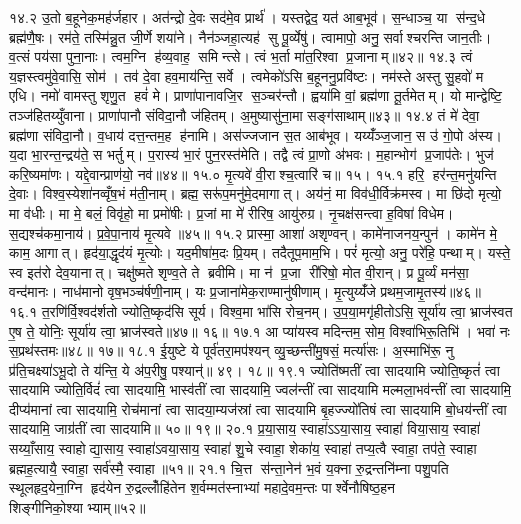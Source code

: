 १४.२
उ॒तो ब॒हूनेक॒मह॑र्जहार। अत॑न्द्रो दे॒वः सद॑मे॒व प्रार्थ॑। यस्तद्वेद॒ यत॑ आब॒भूव॑। स॒न्धाञ्च॒ या स॑न्द॒धे ब्रह्म॑णै॒षः। रम॑ते॒ तस्मि॑न्नु॒त जी॒र्णे शया॑ने। नैन॑ञ्जहा॒त्यह॑ सु पू॒र्व्येषु॑। त्वामापो॒ अनु॒ सर्वाश्चरन्ति जान॒तीः। व॒त्सं पय॑सा पुना॒नाः। त्वम॒ग्नि ह॑व्य॒वाह॒ समिन्त्से। त्वं भ॒र्ता मा॑त॒रिश्वा प्र॒जानाम्॥४२॥
१४.३
त्वं य॒ज्ञस्त्वमु॑वे॒वासि॒ सोम॑। तव॑ दे॒वा हव॒माय॑न्ति॒ सर्वे। त्वमेको॑ऽसि ब॒हूननु॒प्रवि॑ष्टः। नम॑स्ते अस्तु सु॒हवो॑ म एधि। नमो॑ वामस्तु शृणु॒त हवं॑ मे। प्राणा॑पानावजि॒र स॒ञ्चर॑न्तौ। ह्वया॑मि वां॒ ब्रह्म॑णा तू॒र्तमेतम्। यो मान्द्वेष्टि॒ तञ्ज॑हितय्युँवाना। प्राणा॑पानौ संविदा॒नौ ज॑हितम्। अ॒मुष्यासु॑ना॒मा सङ्ग॑साथाम्॥४३॥
१४.४
तं मे॑ देवा॒ ब्रह्म॑णा संविदा॒नौ। व॒धाय॑ दत्त॒न्तम॒ह ह॑नामि। अस॑ज्जजान स॒त आब॑भूव। यय्यँ॑ञ्ज॒जान॒ स उ॑ गो॒पो अ॑स्य। य॒दा भा॒रन्त॒न्द्रय॑ते॒ स भर्तुम्। प॒रास्य॑ भा॒रं पुन॒रस्त॑मेति। तद्वै त्वं प्रा॒णो अ॑भवः। म॒हान्भोग॑ प्र॒जाप॑तेः। भुज॑ करि॒ष्यमा॑णः। यद्दे॒वान्प्राण॑यो॒ नव॑॥४४॥
१५.०
मृ॒त्यवे॑ वी॒राश्च॒त्वारि॑ च॥ १५।
\anuvakamend
१५.१
हरि॒ हर॑न्त॒मनु॑यन्ति दे॒वाः। विश्व॒स्येशा॑नव्वृँष॒भं म॑ती॒नाम्। ब्रह्म॒ सरू॑प॒मनु॑मे॒दमागात्। अय॑नं॒ मा विव॑धी॒र्विक्र॑मस्व। मा छि॑दो मृत्यो॒ मा व॑धीः। मा मे॒ बलं॒  विवृ॑हो॒ मा प्रमो॑षीः। प्र॒जां मा मे॑ रीरिष॒ आयु॑रुग्र। नृ॒चक्ष॑सन्त्वा ह॒विषा॑ विधेम। स॒द्यश्च॑कमा॒नाय॑। प्र॒वे॒पा॒नाय॑ मृ॒त्यवे॥४५॥
१५.२
प्रास्मा॒ आशा॑ अशृण्वन्। कामे॑नाजनय॒न्पुन॑। कामे॑न मे॒ काम॒ आगात्। हृद॑या॒द्धृद॑यं मृ॒त्योः। यद॒मीषा॑म॒दः प्रि॒यम्। तदैतूप॒माम॒भि। परं॑ मृत्यो॒ अनु॒ परे॑हि॒ पन्थाम्। यस्ते॒ स्व इत॑रो देव॒यानात्। चक्षु॑ष्मते शृण्व॒ते ते ब्रवीमि। मा न॑ प्र॒जा री॑रिषो॒ मोत वी॒रान्। प्र पू॒र्व्यं मन॑सा॒ वन्द॑मानः। नाध॑मानो वृष॒भञ्च॑र्\mbox{}षणी॒नाम्। यः प्र॒जाना॑मेक॒राण्मानु॑षीणाम्। मृ॒त्युय्यँ॑जे प्रथम॒जामृ॒तस्य॑॥४६॥
\anuvakamend
१६.१
त॒रणि॑र्वि॒श्वद॑र्\mbox{}शतो ज्योति॒ष्कृद॑सि सूर्य। विश्व॒मा भा॑सि रोच॒नम्। उ॒प॒या॒मगृ॑हीतोऽसि॒ सूर्या॑य त्वा॒ भ्राज॑स्वत ए॒ष ते॒ योनिः॒ सूर्या॑य त्वा॒ भ्राज॑स्वते॥४७॥ १६॥
\anuvakamend
१७.१
आ प्या॑यस्व मदिन्तम॒ सोम॒ विश्वा॑भिरू॒तिभि॑। भवा॑ नः स॒प्रथ॑स्तमः॥४८॥ १७॥
\anuvakamend
१८.१
ई॒युष्टे ये पूर्व॑तरा॒मप॑श्यन् व्यु॒च्छन्ती॑मु॒षसं॒ मर्त्या॑सः। अ॒स्माभि॑रू॒ नु प्र॑ति॒चक्ष्या॑ऽभू॒दो ते य॑न्ति॒ ये अ॑प॒रीषु॒ पश्यान्॑॥ ४९। १८॥
\anuvakamend
१९.१
ज्योति॑ष्मतीं त्वा सादयामि ज्योति॒ष्कृतं॑ त्वा सादयामि ज्योति॒र्विदं॑ त्वा सादयामि॒ भास्व॑तीं त्वा सादयामि॒ ज्वल॑न्तीं त्वा सादयामि मल्मला॒भव॑न्तीं त्वा सादयामि॒ दीप्य॑मानां त्वा सादयामि॒ रोच॑मानां त्वा सादया॒म्यज॑स्रां त्वा सादयामि बृ॒हज्ज्यो॑तिषं त्वा सादयामि बो॒धय॑न्तीं त्वा सादयामि॒ जाग्र॑तीं त्वा सादयामि॥ ५०॥ १९॥
\anuvakamend
२०.१
प्र॒या॒साय॒ स्वाहा॑ऽऽया॒साय॒ स्वाहा॑ विया॒साय॒ स्वाहा॑ सय्याँ॒साय॒ स्वाहोद्या॒साय॒ स्वाहा॑ऽवया॒साय॒ स्वाहा॑ शु॒चे स्वाहा॒ शेका॑य॒ स्वाहा॑ तप्य॒त्वै स्वाहा॒ तप॑ते॒ स्वाहा ब्रह्मह॒त्यायै॒ स्वाहा॒ सर्व॑स्मै॒ स्वाहा॥५१॥%
\anuvakamend
२१.१
चि॒त्त स॑न्ता॒नेन॑ भ॒वं य॒क्ना रु॒द्रन्तनि॑म्ना पशु॒पति स्थूलहृद॒येना॒ग्नि हृद॑येन रु॒द्रल्लोँहि॑तेन श॒र्वम्मत॑स्नाभ्यां महादे॒वम॒न्तः पार्श्वेनौषिष्ठ॒हन शिङ्गीनिको॒श्याभ्याम्॥५२॥%
\anuvakamend

